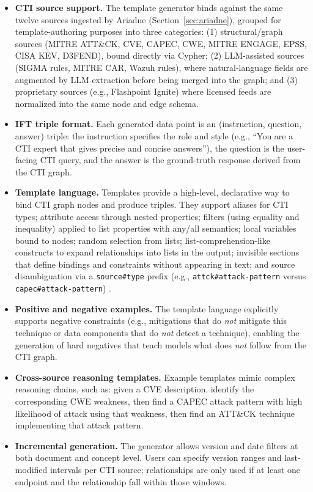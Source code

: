 \documentclass[unnumsec,webpdf,contemporary,large]{oup-authoring-template}
\theoremstyle{thmstyleone}
\theoremstyle{thmstyletwo}
\theoremstyle{thmstylethree}
\begin{document}
\begin{itemize}
  \item \textbf{CTI source support.} The template generator binds against the same twelve sources ingested by Ariadne (Section~\ref{sec:ariadne}), grouped for template-authoring purposes into three categories: (1) structural/graph sources (MITRE ATT\&CK, CVE, CAPEC, CWE, MITRE ENGAGE, EPSS, CISA KEV, D3FEND), bound directly via Cypher; (2) LLM-assisted sources (SIGMA rules, MITRE CAR, Wazuh rules), where natural-language fields are augmented by LLM extraction before being merged into the graph; and (3) proprietary sources (e.g., Flashpoint Ignite) where licensed feeds are normalized into the same node and edge schema.
  \item \textbf{IFT triple format.} Each generated data point is an (instruction, question, answer) triple: the instruction specifies the role and style (e.g., ``You are a CTI expert that gives precise and concise answers''), the question is the user-facing CTI query, and the answer is the ground-truth response derived from the CTI graph.
  \item \textbf{Template language.} Templates provide a high-level, declarative way to bind CTI graph nodes and produce triples. They support aliases for CTI types; attribute access through nested properties; filters (using equality and inequality) applied to list properties with any/all semantics; local variables bound to nodes; random selection from lists; list-comprehension-like constructs to expand relationships into lists in the output; invisible sections that define bindings and constraints without appearing in text; and source disambiguation via a \verb|source#type| prefix (e.g., \verb|attck#attack-pattern| versus \verb|capec#attack-pattern|) \cite{cardei2025ift}.
  \item \textbf{Positive and negative examples.} The template language explicitly supports negative constraints (e.g., mitigations that do \emph{not} mitigate this technique or data components that do \emph{not} detect a technique), enabling the generation of hard negatives that teach models what does \emph{not} follow from the CTI graph.
  \item \textbf{Cross-source reasoning templates.} Example templates mimic complex reasoning chains, such as: given a CVE description, identify the corresponding CWE weakness, then find a CAPEC attack pattern with high likelihood of attack using that weakness, then find an ATT\&CK technique implementing that attack pattern.
  \item \textbf{Incremental generation.} The generator allows version and date filters at both document and concept level. Users can specify version ranges and last-modified intervals per CTI source; relationships are only used if at least one endpoint and the relationship fall within those windows.

\end{itemize}
\end{document}
